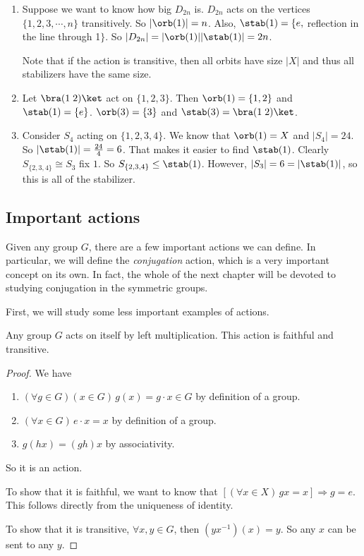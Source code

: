 \documentclass[a4paper]{article}
\begin{document}
\begin{eg}\leavevmode
  \begin{enumerate}
    \item Suppose we want to know how big $D_{2n}$ is. $D_{2n}$ acts on the vertices $\{1, 2, 3, \cdots, n\}$ transitively. So $|\orb(1)| = n$. Also, $\stab(1) =\{e, $ reflection in the line through 1$\}$. So $|D_{2n}| = |\orb(1)||\stab(1)| = 2n$.

      Note that if the action is transitive, then all orbits have size $|X|$ and thus all stabilizers have the same size.
    \item Let $\bra (1\; 2)\ket$ act on $\{1, 2, 3\}$. Then $\orb(1) = \{1, 2\}$ and $\stab(1) = \{e\}$. $\orb(3) = \{3\}$ and $\stab(3) = \bra(1\; 2)\ket$.
    \item Consider $S_4$ acting on $\{1, 2, 3, 4\}$. We know that $\orb(1) = X$ and $|S_4| = 24$. So $|\stab(1)| = \frac{24}{4} = 6$. That makes it easier to find $\stab(1)$. Clearly $S_{\{2, 3, 4\}} \cong S_3$ fix $1$. So $S_{\{2, 3, 4\}}\leq \stab(1)$. However, $|S_3| = 6 = |\stab(1)|$, so this is all of the stabilizer.
  \end{enumerate}
\end{eg}

\subsection{Important actions}
Given any group $G$, there are a few important actions we can define. In particular, we will define the \emph{conjugation} action, which is a very important concept on its own. In fact, the whole of the next chapter will be devoted to studying conjugation in the symmetric groups.

First, we will study some less important examples of actions.
\begin{lemma}
  Any group $G$ acts on itself by left multiplication. This action is faithful and transitive.
\end{lemma}
\begin{proof}
  We have
  \begin{enumerate}[label=\arabic{*}.]
    \item $(\forall g\in G)(x\in G)\,g(x) = g\cdot x \in G$ by definition of a group.
    \item $(\forall x\in G)\,e\cdot x = x$ by definition of a group.
    \item $g(hx) = (gh)x$ by associativity.
  \end{enumerate}
  So it is an action.

  To show that it is faithful, we want to know that $[(\forall x\in X)\,gx = x]\Rightarrow g = e$. This follows directly from the uniqueness of identity.

  To show that it is transitive, $\forall x, y\in G$, then $(yx^{-1})(x) = y$. So any $x$ can be sent to any $y$.
\end{proof}
\end{document}
